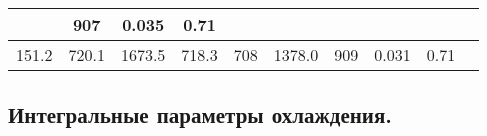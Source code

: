 \documentclass[a4paper,10pt]{article}
\begin{document}
\begin{longtable}{
     |
%    
    c|
%    
    c|
%    
    c|
%    
    c|
%    
    c|
%    
    c|
%    
    c|
%    
    c|
%    
    c|
%    
    c|
%    
    }
%        
        & 907
%        

%        

%        
        & 0.035
%        

%        

%        
        & 0.71
%        

%        
        \\
        \hline

        

%        

%        
        151.2
%        

%        

%        
        & 720.1
%        

%        

%        
        & 1673.5
%        

%        

%        
        & 718.3
%        

%        

%        
        & 708
%        

%        

%        
        & 1378.0
%        

%        

%        
        & 909
%        

%        

%        
        & 0.031
%        

%        

%        
        & 0.71
%        

%        
        \\
        \hline

        
    \end{longtable}
%    

    \subsection{Интегральные параметры охлаждения.}
\end{document}
